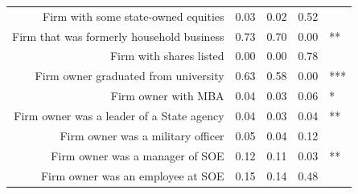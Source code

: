 \documentclass{beamer}
\begin{document}
\begin{frame}
\begin{columns}[T]
\begin{column}{.48\textwidth}
{{\begin{tabular}{rrrrl}
  Firm with some state-owned equities & 0.03 & 0.02 & 0.52 &  \\ 
  Firm that was formerly household business & 0.73 & 0.70 & 0.00 & ** \\ 
  Firm with shares listed & 0.00 & 0.00 & 0.78 &  \\ 
  Firm owner graduated from university & 0.63 & 0.58 & 0.00 & *** \\ 
  Firm owner with MBA & 0.04 & 0.03 & 0.06 & * \\ 
  Firm owner was a leader of a State agency & 0.04 & 0.03 & 0.04 & ** \\ 
  Firm owner was a military officer & 0.05 & 0.04 & 0.12 &  \\ 
  Firm owner was a manager of SOE & 0.12 & 0.11 & 0.03 & ** \\ 
  Firm owner was an employee at SOE & 0.15 & 0.14 & 0.48 &  \\ 
   \hline
\end{tabular}          
}}
\end{column}%
\end{columns}
\end{frame}
\end{document}
